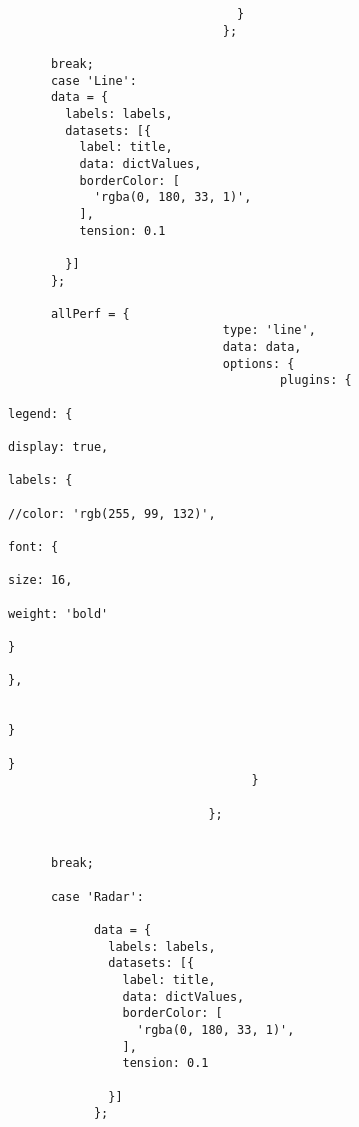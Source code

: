 \begin{lstlisting}
                                }
                              };

      break;
      case 'Line':
      data = {
        labels: labels,
        datasets: [{
          label: title,
          data: dictValues,
          borderColor: [
            'rgba(0, 180, 33, 1)',
          ],
          tension: 0.1

        }]
      };

      allPerf = {
                              type: 'line',
                              data: data,
                              options: {
                                      plugins: {
                                                                                      legend: {
                                                                                          display: true,
                                                                                          labels: {
                                                                                              //color: 'rgb(255, 99, 132)',
                                                                                               font: {
                                                                                                  size: 16,
                                                                                                  weight: 'bold'
                                                                                               }
                                                                                          },

                                                                                      }
                                                                                  }
                                  }

                            };


      break;

      case 'Radar':

            data = {
              labels: labels,
              datasets: [{
                label: title,
                data: dictValues,
                borderColor: [
                  'rgba(0, 180, 33, 1)',
                ],
                tension: 0.1

              }]
            };


\end{lstlisting}
